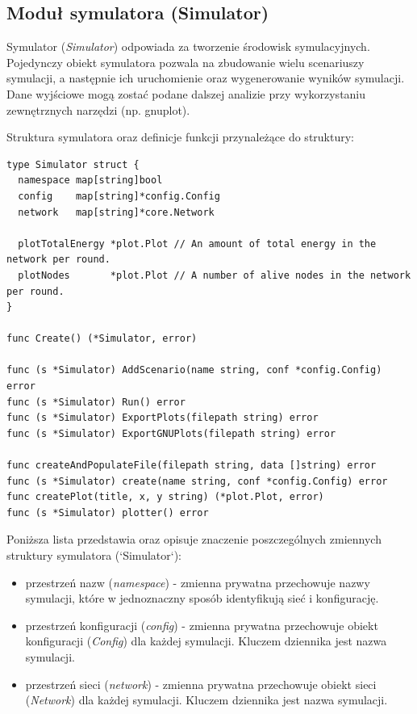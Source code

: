 \documentclass[a4paper,12pt,twoside,openany]{report}
\begin{document}
\subsection{Moduł symulatora (Simulator)}

Symulator (\textit{Simulator}) odpowiada za tworzenie środowisk symulacyjnych.
Pojedynczy obiekt symulatora pozwala na zbudowanie wielu scenariuszy symulacji, a następnie ich uruchomienie oraz
wygenerowanie wyników symulacji. Dane wyjściowe mogą zostać podane dalszej analizie przy wykorzystaniu zewnętrznych narzędzi (np. gnuplot).

Struktura symulatora oraz definicje funkcji przynależące do struktury:
 
\begin{lstlisting}
type Simulator struct {
  namespace map[string]bool
  config    map[string]*config.Config
  network   map[string]*core.Network

  plotTotalEnergy *plot.Plot // An amount of total energy in the network per round.
  plotNodes       *plot.Plot // A number of alive nodes in the network per round.
}

func Create() (*Simulator, error)

func (s *Simulator) AddScenario(name string, conf *config.Config) error
func (s *Simulator) Run() error
func (s *Simulator) ExportPlots(filepath string) error
func (s *Simulator) ExportGNUPlots(filepath string) error

func createAndPopulateFile(filepath string, data []string) error
func (s *Simulator) create(name string, conf *config.Config) error
func createPlot(title, x, y string) (*plot.Plot, error)
func (s *Simulator) plotter() error
\end{lstlisting}

Poniższa lista przedstawia oraz opisuje znaczenie poszczególnych zmiennych struktury symulatora (`Simulator`):

\begin{itemize}
 \item przestrzeń nazw (\textit{namespace}) - zmienna prywatna przechowuje nazwy symulacji, które w jednoznaczny sposób identyfikują sieć i konfigurację.
 \item przestrzeń konfiguracji (\textit{config}) - zmienna prywatna przechowuje obiekt konfiguracji (\textit{Config}) dla każdej symulacji. Kluczem dziennika jest nazwa symulacji.
 \item przestrzeń sieci (\textit{network}) - zmienna prywatna przechowuje obiekt sieci (\textit{Network}) dla każdej symulacji. Kluczem dziennika jest nazwa symulacji.
\end{itemize}
\end{document}
